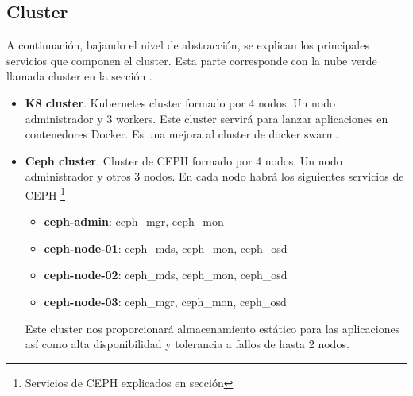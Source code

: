         \subsection{Cluster}
                \begin{text}
                        A continuación, bajando el nivel de abstracción, se explican los principales servicios que componen el cluster. Esta parte corresponde con la nube verde llamada cluster en la sección .
                        \begin{itemize}
                                \item \textbf{K8 cluster}. Kubernetes cluster formado por 4 nodos. Un nodo administrador y 3 workers. Este cluster servirá para lanzar aplicaciones en contenedores Docker. Es una mejora al cluster de docker swarm.
                                \item \textbf{Ceph cluster}. Cluster de CEPH formado por 4 nodos. Un nodo administrador y otros 3 nodos. En cada nodo habrá los siguientes servicios de CEPH \footnote{Servicios de CEPH explicados en sección }
                                \begin{itemize}
                                        \item \textbf{ceph-admin}: ceph\_mgr, ceph\_mon
                                        \item \textbf{ceph-node-01}: ceph\_mds, ceph\_mon, ceph\_osd
                                        \item \textbf{ceph-node-02}: ceph\_mds, ceph\_mon, ceph\_osd
                                        \item \textbf{ceph-node-03}: ceph\_mgr, ceph\_mon, ceph\_osd
                                \end{itemize}
                                Este cluster nos proporcionará almacenamiento estático para las aplicaciones así como alta disponibilidad y tolerancia a fallos de hasta 2 nodos.


\end{itemize}
\end{text}
